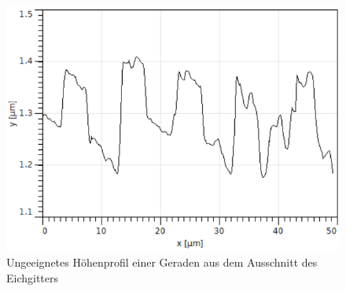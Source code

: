 \begin{figure}[h]
    \centering
    \includegraphics[scale = 0.65]{Bilder/zUngeeignet.png}
    \caption{Ungeeignetes Höhenprofil einer Geraden aus dem Ausschnitt des Eichgitters}
    \label{bild:zUngeeignet}
\end{figure}

\newpage